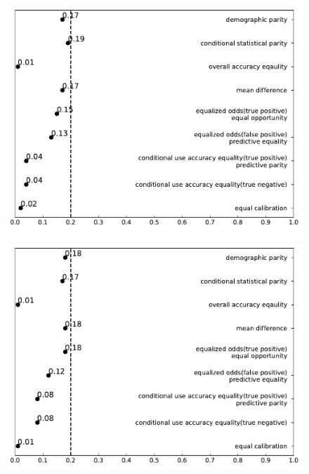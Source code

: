 \documentclass[conference]{IEEEtran}
\begin{document}
\begin{figure}[h]
\begin{minipage}[b]{0.48\linewidth}
        \centering
        \includegraphics[width=\linewidth]{Non-Caucasian}
        \label{fig:2}
    \end{minipage}
    \hfill
    \begin{minipage}[b]{0.48\linewidth}
        \centering
        \includegraphics[width=\linewidth]{Non-Hispanic}
        \label{fig:2}
    \end{minipage}
    \hfill
    \begin{minipage}[b]{0.48\linewidth}
        \centering

\end{minipage}
\end{figure}
\end{document}
